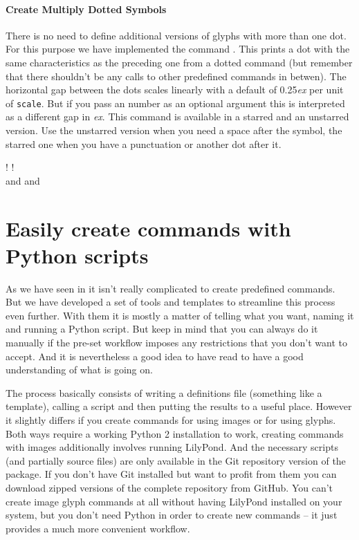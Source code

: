 \documentclass{OLLbook}
\begin{document}
\subsubsection{Create Multiply Dotted Symbols}
\label{subsubsec:multiply_dotted_symbols}

There is no need to define additional versions of glyphs with more than one dot.
For this purpose we have implemented the command .
This prints a dot with the same characteristics as the preceding one from a dotted command (but remember that there shouldn't be any calls to other predefined commands in betwen).
The horizontal gap between the dots scales linearly with a default of 0.25\emph{ex} per unit of \texttt{scale}.
But if you pass an number as an optional argument this is interpreted as a different gap in \emph{ex}.
This command is available in a starred and an unstarred version.
Use the unstarred version when you need a space after the symbol, the starred one when you have a punctuation or another dot after it.

\noindent {}! 
\halfNoteRestDotted*\lilyPrintMoreDots*!\\
 and 
\halfNoteRestDotted*[scale=1.5]\lilyPrintMoreDots and 


\chapter{Easily create commands with Python scripts}
\label{chap:python_scripts}
As we have seen in  it isn't really complicated to create predefined commands.
But we have developed a set of tools and templates to streamline this process even further.
With them it is mostly a matter of telling what you want, naming it and running a Python script.
But keep in mind that you can always do it manually if the pre-set workflow imposes any restrictions that you don't want to accept.
And it is nevertheless a good idea to have read  to have a good understanding of what is going on.

The process basically consists of writing a definitions file (something like a template), calling a script and then putting the results to a useful place.
However it slightly differs if you create commands for using images or for using \emmentaler glyphs.
Both ways require a working Python 2 installation to work, creating commands with images additionally involves running LilyPond.
And the necessary scripts (and partially source files) are only available in the Git repository version of the package.
If you don't have Git installed but want to profit from them you can download zipped versions of the complete repository from GitHub.
You can't create image glyph commands at all without having LilyPond installed on your system, but you don't need Python in order to create new commands -- it just provides a much more convenient workflow.
\end{document}
